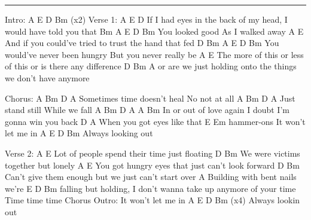 \noindent\rule{\columnwidth}{1pt}

\begin{lstsong}
Intro:
A   E   D   Bm   (x2)
Verse 1:
A                    E                             D
If I had eyes in the back of my head, I would have told you that
                     Bm               A      E     D     Bm
You looked good As I walked away
A                    E
And if you could've tried to trust the hand that fed
             D             Bm                           A    E    D    Bm
You would've never been hungry But you never really be
       A                            E
The more of this or less of this or is there any difference
   D                            Bm                        A
or are we just holding onto the things we don't have anymore

Chorus:
          A            Bm   D         A
Sometimes time doesn't heal No not at all
A          Bm    D            A
Just stand still While we fall
A     Bm          D     A                 A       Bm
In or out of love again I doubt I'm gonna win you back
D            A
When you got eyes like that
                   E Em hammer-ons
It won't let me in
               A   E   D   Bm
Always looking out

Verse 2:
A                         E
Lot of people spend their time just floating
D                   Bm
We were victims together but lonely
A                        E
You got hungry eyes that just can't look forward
D                             Bm
Can't give them enough but we just can't start over
A
Building with bent nails we're
E                     D                     Bm
falling but holding, I don't wanna take up anymore of your time
Time time time
Chorus
Outro:
It won't let me in
                A   E   D   Bm  (x4)
Always lookin out
\end{lstsong}
\newpage


